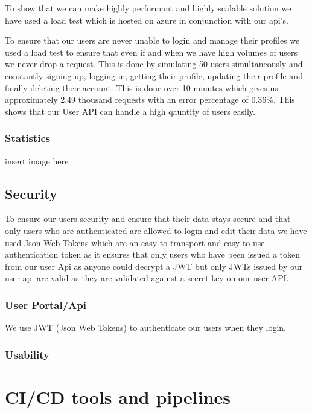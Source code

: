 \documentclass[a4paper]{article}
\begin{document}
To show that we can make highly performant and highly scalable solution we have 
used a load test which is hosted on azure in conjunction with our api's. \newline

To ensure that our users are never unable to login and manage their profiles we 
used a load test to ensure that even if and when we have high volumes of users we 
never drop a request. This is done by simulating 50 users simultaneously and 
constantly signing up, logging in, getting their profile, updating their profile
and finally deleting their account. This is done over 10 minutes which gives us
approximately 2.49 thousand requests with an error percentage of 0.36\%. This 
shows that our User API can handle a high qauntity of users easily.


\subsubsection{Statistics}
insert image here

\subsection{Security}
To ensure our users security and ensure that their data stays secure and that 
only users who are authenticated are allowed to login and edit their data we 
have used Json Web Tokens which are an easy to transport and easy to use authentication
token as it ensures that only users who have been issued a token from our user Api
as anyone could decrypt a JWT but only JWTs issued by our user api are valid as they 
are validated against a secret key on our user API.

\subsubsection{User Portal/Api}

We use JWT (Json Web Tokens) to authenticate our users when they login.

\subsubsection{Usability}


\newpage

\section{CI/CD tools and pipelines}
\end{document}
